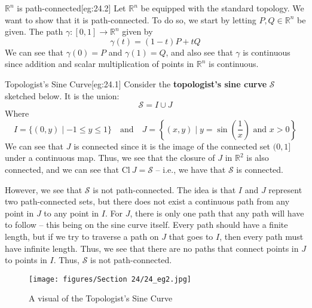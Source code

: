\begin{egBox}{\( \mathbb{R}^{ n } \) is path-connected}[eg:24.2]
    Let \( \mathbb{R}^{ n } \) be equipped with the standard topology.
    We want to show that it is path-connected.
    To do so, we start by letting \( P, Q \in \mathbb{R}^{ n } \) be given.
    The path \( \gamma: [ 0, 1 ] \rightarrow \mathbb{R}^{ n } \) given by
    \begin{equation*}
        \gamma ( t )
        =
        ( 1 - t ) P + t Q
    \end{equation*}
    We can see that \( \gamma ( 0 ) = P \) and \( \gamma ( 1 ) = Q \), and 
    also see that \( \gamma \) is continuous since addition and scalar 
    multiplication of points in \( \mathbb{R}^{ n } \) is continuous.
\end{egBox}

\begin{egBox}{Topologist's Sine Curve}[eg:24.1]
    Consider the \textbf{topologist's sine curve} \( \mathcal{S} \) sketched
    below. 
    It is the union: 
    \begin{equation*}
        \mathcal{S}
        =
        I \cup J    
    \end{equation*}
    Where
    \begin{equation*}
        I
        =
        \{ ( 0, y ) \mid -1 \leq y \leq 1 \}
        \quad \mathrm{and} \quad 
        J
        =
        \left\{ ( x, y ) \mid y = \sin \left( \frac{ 1 }{ x } \right) 
        \text{ and } x > 0 \right\}
    \end{equation*}
    We can see that \( J \) is connected since it is the image of 
    the connected set \( ( 0, 1 ] \) under a continuous map.
    Thus, we see that the closure of \( J \) in \( \mathbb{R}^{ 2 } \) is also
    connected, and we can see that \( \mathrm{Cl} \ J = \mathcal{S} \) --
    i.e., we have that \( \mathcal{S} \) is connected.

    \baseSkip

    However, we see that \( \mathcal{S} \) is not path-connected.
    The idea is that \( I \) and \( J \) represent two path-connected sets, but
    there does not exist a continuous path from any point in \( J \) to any 
    point in \( I \).
    For \( J \), there is only one path that any path will have to follow --
    this being on the sine curve itself.
    Every path should have a finite length, but if we try to traverse a path on
    \( J \) that goes to \( I \), then every path must have infinite length.
    Thus, we see that there are no paths that connect points in \( J \) to 
    points in \( I \).
    Thus, \( \mathcal{S} \) is not path-connected.

    \begin{figure}[H]
        \centering
        \texttt{[image: figures/Section 24/24\_eg2.jpg]}
        \caption{A visual of the Topologist's Sine Curve}
        \label{fig:24-1}
    \end{figure}
\end{egBox}